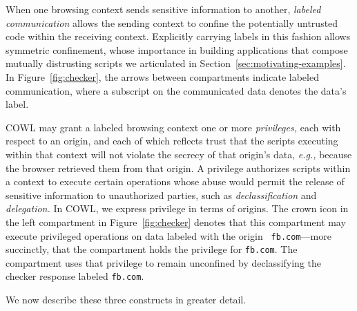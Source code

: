 When one browsing context sends sensitive information to another, {\em
  labeled communication} allows the sending context to confine the
potentially untrusted code within the receiving context. Explicitly
carrying labels in this fashion allows symmetric confinement, whose
importance in building applications that compose mutually distrusting
scripts we articulated in Section~\ref{sec:motivating-examples}. In
Figure~\ref{fig:checker}, the arrows between compartments indicate
labeled communication, where a subscript on the communicated data
denotes the data's label.

COWL may grant a labeled browsing context one or more {\em
  privileges,} each with respect to an origin, and each of which
reflects trust that the scripts executing within that context will not
violate the secrecy of that origin's data, \emph{e.g.,} because the browser
retrieved them from that origin. A privilege authorizes scripts within
a context to execute certain operations whose abuse would permit the
release of sensitive information to unauthorized parties, such as {\em
  declassification} and {\em delegation.} In COWL, we express privilege
in terms of origins. The crown icon in the left compartment in
Figure~\ref{fig:checker} denotes that this compartment may execute
privileged operations on data labeled with the origin {\tt
  fb.com}---more succinctly, that the compartment holds the privilege
for {\tt fb.com}. The compartment uses that privilege to remain
unconfined by declassifying the checker response labeled {\tt fb.com}.


We now describe these three constructs in greater detail.



